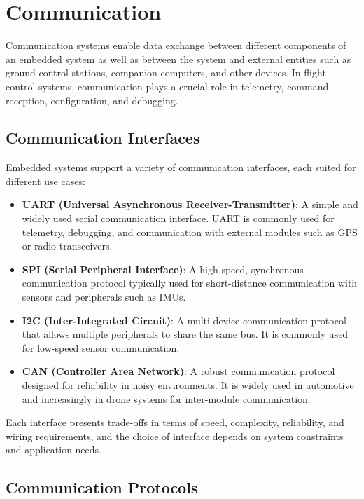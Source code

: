 \section{Communication}
\label{sec:communication}

Communication systems enable data exchange between different components of an embedded system as well as between the system and external entities such as ground control stations, companion computers, and other devices. In flight control systems, communication plays a crucial role in telemetry, command reception, configuration, and debugging.

\subsection{Communication Interfaces}

Embedded systems support a variety of communication interfaces, each suited for different use cases:

\begin{itemize}
    \item \textbf{UART (Universal Asynchronous Receiver-Transmitter)}:  
    A simple and widely used serial communication interface. UART is commonly used for telemetry, debugging, and communication with external modules such as GPS or radio transceivers.

    \item \textbf{SPI (Serial Peripheral Interface)}:  
    A high-speed, synchronous communication protocol typically used for short-distance communication with sensors and peripherals such as IMUs.

    \item \textbf{I2C (Inter-Integrated Circuit)}:  
    A multi-device communication protocol that allows multiple peripherals to share the same bus. It is commonly used for low-speed sensor communication.

    \item \textbf{CAN (Controller Area Network)}:  
    A robust communication protocol designed for reliability in noisy environments. It is widely used in automotive and increasingly in drone systems for inter-module communication.
\end{itemize}

Each interface presents trade-offs in terms of speed, complexity, reliability, and wiring requirements, and the choice of interface depends on system constraints and application needs.

\subsection{Communication Protocols}

